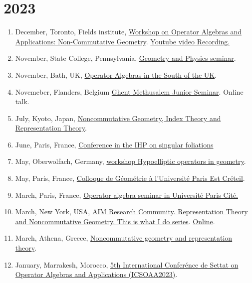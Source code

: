 \documentclass[a4paper, 13pt]{article}
\begin{document}
\section*{2023}
\begin{enumerate}
\item December, Toronto, Fields institute, \href{http://www.fields.utoronto.ca/activities/23-24/operator-noncommutative}{Workshop on Operator Algebras and Applications: Non-Commutative Geometry}. \href{https://www.youtube.com/watch?v=sufxJSKJ_qk&list=PLArBKNfJxuum6xCTUag8Yso0wnN8ayESE&index=21}{Youtube video Recording.}
\item November, State College, Pennsylvania, \href{https://math-cal.cloud.science.psu.edu/events/seminar/408}{Geometry and Physics seminar}.
\item November, Bath, UK, \href{https://sites.google.com/view/operatoralgebrasinthesouth/home}{Operator Algebras in the South of the UK}.
\item Novemeber, Flanders, Belgium \href{https://analysis-pde.org/ghent-methusalem-junior-seminar/}{Ghent Methusalem Junior Seminar}. Online talk.
\item July, Kyoto, Japan, \href{https://indico.math.cnrs.fr/event/8330/}{Noncommutative Geometry, Index Theory and Representation Theory}.
\item June, Paris, France, \href{https://indico.math.cnrs.fr/event/7893/timetable/}{Conference in the IHP on singular foliations}
\item May, Oberwolfach, Germany, \href{https://www.mfo.de/occasion/2321/www_view}{workshop Hypoelliptic operators in geometry}.
\item May, Paris, France, \href{https://fanoni.perso.math.cnrs.fr/colloque.html}{Colloque de Géométrie à l'Université Paris Est Créteil}.
\item March, Paris, France, \href{https://www.imj-prg.fr/ao/seminaires/}{Operator algebra seminar in Université Paris Cité.} 
\item March, New York, USA, \href{https://prclare.people.wm.edu/AIM_RTNCG/tiwid.php}{AIM Research Community. Representation Theory and Noncommutative Geometry. This is what I do series}. \href{}{Online}.
\item March, Athena, Greece, \href{https://conferences.uoa.gr/event/56/}{Noncommutative geometry and representation theory}.
\item January, Marrakesh, Morocco, \href{https://sites.google.com/view/icsoaa-2023/}{5th International Conferénce de Settat on Operator Algebras and Applications (ICSOAA2023)}.
\end{enumerate}
\end{document}

